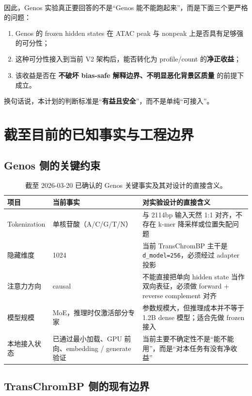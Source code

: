 \documentclass[11pt,a4paper]{ctexart}
\begin{document}
因此，Genos 实验真正要回答的不是“Genos 能不能跑起来”，而是下面三个更严格的问题：

\begin{enumerate}[leftmargin=2em]
  \item Genos 的 frozen hidden states 在 ATAC peak 与 nonpeak 上是否具有足够强的可分性；
  \item 这种可分性接入到当前 V2 架构后，能否转化为 profile/count 的\textbf{净正收益}；
  \item 该收益是否在 \textbf{不破坏 bias-safe 解释边界、不明显恶化背景区质量} 的前提下成立。
\end{enumerate}

换句话说，本计划的判断标准是“\textbf{有益且安全}”，而不是单纯“可接入”。

\section{截至目前的已知事实与工程边界}

\subsection{Genos 侧的关键约束}

\begin{table}[H]
\centering
\small
\caption{截至 2026-03-20 已确认的 Genos 关键事实及其对设计的直接含义。}
\label{tab:genos_facts}
\begin{tabularx}{\textwidth}{l l Y}
\toprule
项目 & 当前事实 & 对实验设计的直接含义 \\
\midrule
Tokenization & 单核苷酸（A/C/G/T/N） & 与 2114bp 输入天然 1:1 对齐，不存在 k-mer 降采样或位置失配问题 \\
隐藏维度 & 1024 & 当前 TransChromBP 主干是 \texttt{d\_model=256}，必须经过 adapter 投影 \\
注意力方向 & causal & 不能直接把单向 hidden state 当作双向表征，必须做 forward + reverse complement 对齐 \\
模型规模 & MoE，推理时仅激活部分专家 & 参数规模大，但推理成本并不等于 1.2B dense 模型；适合先做 frozen 接入 \\
本地接入状态 & 已通过最小加载、GPU 前向、embedding / generate 验证 & 当前主要不确定性不是“能不能用”，而是“对本任务有没有净收益” \\
\bottomrule
\end{tabularx}
\end{table}

\subsection{TransChromBP 侧的现有边界}
\end{document}
